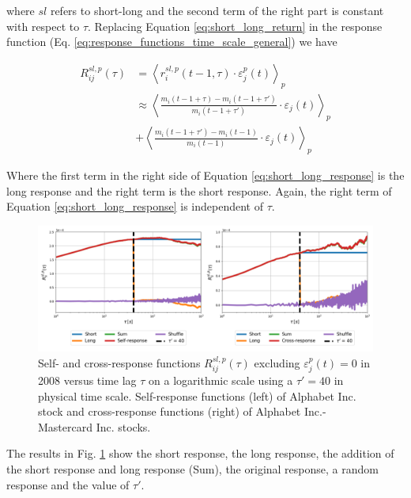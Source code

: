 where $sl$ refers to short-long and the second term of the right part is
constant with respect to $\tau$. Replacing Equation \ref{eq:short_long_return}
in the response function (Eq. \ref{eq:response_functions_time_scale_general})
we have

\begin{align}\label{eq:short_long_response}
    R^{sl,p}_{ij}\left(\tau\right)&=\left\langle
    r^{sl,p}_{i}\left(t - 1, \tau\right)
    \cdot\varepsilon^{p}_{j}\left(t\right)\right\rangle _{p} \nonumber \\
    &\approx\left\langle \frac{m_{i}\left(t - 1 +\tau\right)-m_{i}
    \left(t - 1 +\tau'\right)} {m_{i}\left(t - 1 +\tau'\right)}
    \cdot\varepsilon_{j} \left(t\right)\right\rangle _{p} \nonumber \\
    & +\left\langle \frac{m_{i} \left(t - 1 +\tau'\right)-m_{i}
    \left(t - 1\right)}{m_{i}\left(t - 1\right)}
    \cdot\varepsilon_{j}\left(t\right)\right\rangle _{p}
\end{align}

Where the first term in the right side of Equation \ref{eq:short_long_response}
is the long response and the right term is the short response. Again, the right
term of Equation \ref{eq:short_long_response} is independent of $\tau$.

\begin{figure}[htbp]
    \centering
    \includegraphics[width=\textwidth]
    {figures/05_short_long_GOOG_MA.png}
    \caption{Self- and cross-response functions
             $R^{sl,p}_{ij}\left(\tau\right)$ excluding
             $\varepsilon^{p}_{j}\left(t\right) = 0$ in 2008 versus time lag
             $\tau$ on a logarithmic scale using a $\tau'=40$ in physical time
             scale. Self-response functions (left) of Alphabet Inc. stock and
             cross-response functions (right) of Alphabet Inc.-Mastercard Inc.
             stocks.}
    \label{fig:short_long_responses}
\end{figure}

The results in Fig. \ref{fig:short_long_responses} show the short response, the
long response, the addition of the short response and long response (Sum), the
original response, a random response and the value of $\tau'$.

